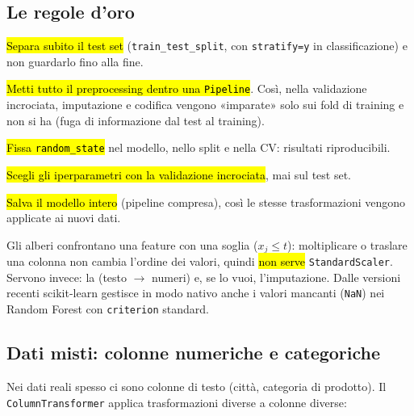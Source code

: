 \subsection{Le regole d'oro}

\begin{passi}
  \item \hl{Separa subito il test set} (\texttt{train\_test\_split}, con \texttt{stratify=y} in classificazione) e non guardarlo fino alla fine.
  \item \hl{Metti tutto il preprocessing dentro una \texttt{Pipeline}}. Così, nella validazione incrociata, imputazione e codifica vengono «imparate» solo sui fold di training e non si ha  (fuga di informazione dal test al training).
  \item \hl{Fissa \texttt{random\_state}} nel modello, nello split e nella CV: risultati riproducibili.
  \item \hl{Scegli gli iperparametri con la validazione incrociata}, mai sul test set.
  \item \hl{Salva il modello intero} (pipeline compresa), così le stesse trasformazioni vengono applicate ai nuovi dati.
\end{passi}

\begin{mlbox}
Gli alberi confrontano una feature con una soglia ($x_j\le t$): moltiplicare o traslare una colonna non cambia l'ordine dei valori, quindi \hl{non serve} \texttt{StandardScaler}. Servono invece: la  (testo $\rightarrow$ numeri) e, se lo vuoi, l'imputazione. Dalle versioni recenti scikit-learn gestisce in modo nativo anche i valori mancanti (\texttt{NaN}) nei Random Forest con \texttt{criterion} standard.
\end{mlbox}

\subsection{Dati misti: colonne numeriche e categoriche}

Nei dati reali spesso ci sono colonne di testo (città, categoria di prodotto). Il \texttt{ColumnTransformer} applica trasformazioni diverse a colonne diverse:


